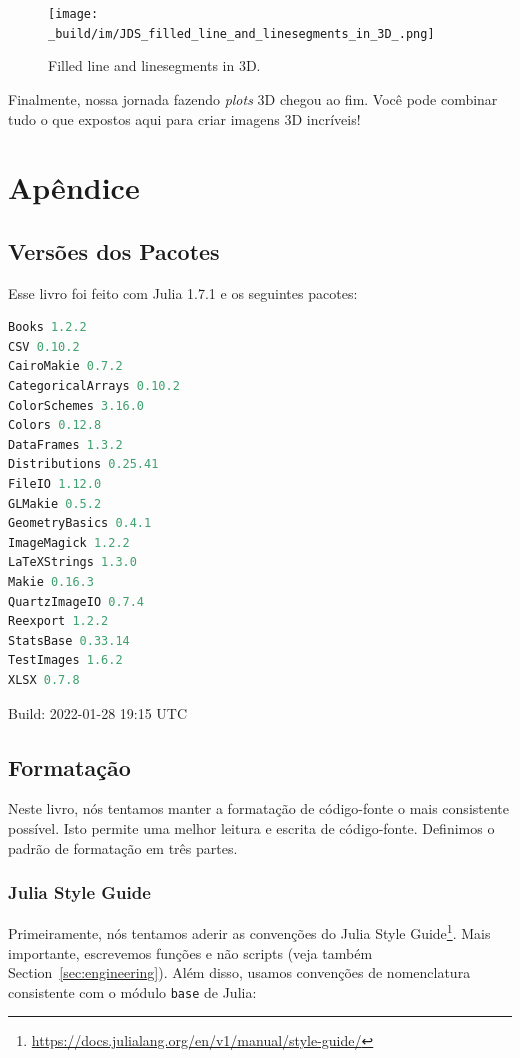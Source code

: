 \documentclass[
  notoc %
]{tufte-book}
\DeclareRobustCommand{\href}[2]{#2\footnote{\url{#1}}}
\newcommand{\passthrough}[1]{#1}
\begin{document}
\begin{figure}
\hypertarget{fig:filled_line_and_linesegments_in_3D}{%
\centering
\texttt{[image: \_build/im/JDS\_filled\_line\_and\_linesegments\_in\_3D\_.png]}
\caption{Filled line and linesegments in
3D.}\label{fig:filled_line_and_linesegments_in_3D}
}
\end{figure}

Finalmente, nossa jornada fazendo \emph{plots} 3D chegou ao fim. Você
pode combinar tudo o que expostos aqui para criar imagens 3D incríveis!

\hypertarget{sec:appendix}{%
\chapter{Apêndice}\label{sec:appendix}}

\hypertarget{sec:appendix_pkg}{%
\section{Versões dos Pacotes}\label{sec:appendix_pkg}}

Esse livro foi feito com Julia 1.7.1 e os seguintes pacotes:

\begin{lstlisting}[language=Julia]
Books 1.2.2
CSV 0.10.2
CairoMakie 0.7.2
CategoricalArrays 0.10.2
ColorSchemes 3.16.0
Colors 0.12.8
DataFrames 1.3.2
Distributions 0.25.41
FileIO 1.12.0
GLMakie 0.5.2
GeometryBasics 0.4.1
ImageMagick 1.2.2
LaTeXStrings 1.3.0
Makie 0.16.3
QuartzImageIO 0.7.4
Reexport 1.2.2
StatsBase 0.33.14
TestImages 1.6.2
XLSX 0.7.8
\end{lstlisting}

Build: 2022-01-28 19:15 UTC

\hypertarget{sec:notation}{%
\section{Formatação}\label{sec:notation}}

Neste livro, nós tentamos manter a formatação de código-fonte o mais
consistente possível. Isto permite uma melhor leitura e escrita de
código-fonte. Definimos o padrão de formatação em três partes.

\hypertarget{julia-style-guide}{%
\subsection{Julia Style Guide}\label{julia-style-guide}}

Primeiramente, nós tentamos aderir as convenções do
\href{https://docs.julialang.org/en/v1/manual/style-guide/}{Julia Style
Guide}. Mais importante, escrevemos funções e não scripts (veja também
Section~\ref{sec:engineering}). Além disso, usamos convenções de
nomenclatura consistente com o módulo \passthrough{\lstinline!base!} de
Julia:
\end{document}
